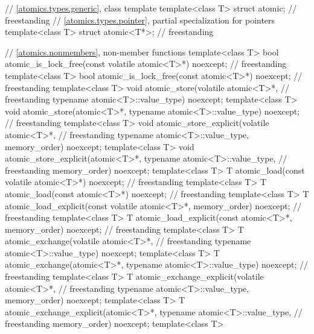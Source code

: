 \begin{codeblock}
{  // \ref{atomics.types.generic}, class template 
  template<class T> struct atomic;                                                  // freestanding
  // \ref{atomics.types.pointer}, partial specialization for pointers
  template<class T> struct atomic<T*>;                                              // freestanding

  // \ref{atomics.nonmembers}, non-member functions
  template<class T>
    bool atomic_is_lock_free(const volatile atomic<T>*) noexcept;                   // freestanding
  template<class T>
    bool atomic_is_lock_free(const atomic<T>*) noexcept;                            // freestanding
  template<class T>
    void atomic_store(volatile atomic<T>*,                                          // freestanding
                      typename atomic<T>::value_type) noexcept;
  template<class T>
    void atomic_store(atomic<T>*, typename atomic<T>::value_type) noexcept;         // freestanding
  template<class T>
    void atomic_store_explicit(volatile atomic<T>*,                                 // freestanding
                               typename atomic<T>::value_type,
                               memory_order) noexcept;
  template<class T>
    void atomic_store_explicit(atomic<T>*, typename atomic<T>::value_type,          // freestanding
                               memory_order) noexcept;
  template<class T>
    T atomic_load(const volatile atomic<T>*) noexcept;                              // freestanding
  template<class T>
    T atomic_load(const atomic<T>*) noexcept;                                       // freestanding
  template<class T>
    T atomic_load_explicit(const volatile atomic<T>*, memory_order) noexcept;       // freestanding
  template<class T>
    T atomic_load_explicit(const atomic<T>*, memory_order) noexcept;                // freestanding
  template<class T>
    T atomic_exchange(volatile atomic<T>*,                                          // freestanding
                      typename atomic<T>::value_type) noexcept;
  template<class T>
    T atomic_exchange(atomic<T>*, typename atomic<T>::value_type) noexcept;         // freestanding
  template<class T>
    T atomic_exchange_explicit(volatile atomic<T>*,                                 // freestanding
                               typename atomic<T>::value_type,
                               memory_order) noexcept;
  template<class T>
    T atomic_exchange_explicit(atomic<T>*, typename atomic<T>::value_type,          // freestanding
                               memory_order) noexcept;
  template<class T>
}
\end{codeblock}
